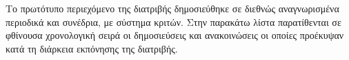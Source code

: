 \newpage
Το πρωτότυπο περιεχόμενο της διατριβής δημοσιεύθηκε σε διεθνώς αναγνωρισμένα
περιοδικά και συνέδρια, με σύστημα κριτών. Στην παρακάτω λίστα παρατίθενται σε
φθίνουσα χρονολογική σειρά οι δημοσιεύσεις και ανακοινώσεις οι οποίες προέκυψαν
κατά τη διάρκεια εκπόνησης της διατριβής.\\

{\footnotesize
{}

\\

\\

\\

\\

\\

\\

\\

\\

\\

\\

\\


}

